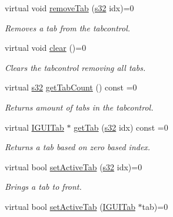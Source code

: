 \begin{DoxyCompactItemize}
virtual void \hyperlink{classirr_1_1gui_1_1IGUITabControl_a0d79c9d666527201b57e859e69b7523c}{remove\+Tab} (\hyperlink{namespaceirr_ac66849b7a6ed16e30ebede579f9b47c6}{s32} idx)=0
\begin{DoxyCompactList}\small\item\em Removes a tab from the tabcontrol. \end{DoxyCompactList}\item 
\mbox{\label{classirr_1_1gui_1_1IGUITabControl_ac5a41030a1fa56978da2142e00fef3f1}} 
virtual void \hyperlink{classirr_1_1gui_1_1IGUITabControl_ac5a41030a1fa56978da2142e00fef3f1}{clear} ()=0
\begin{DoxyCompactList}\small\item\em Clears the tabcontrol removing all tabs. \end{DoxyCompactList}\item 
\mbox{\label{classirr_1_1gui_1_1IGUITabControl_a9c0571f79bb538936182542562d2c520}} 
virtual \hyperlink{namespaceirr_ac66849b7a6ed16e30ebede579f9b47c6}{s32} \hyperlink{classirr_1_1gui_1_1IGUITabControl_a9c0571f79bb538936182542562d2c520}{get\+Tab\+Count} () const =0
\begin{DoxyCompactList}\small\item\em Returns amount of tabs in the tabcontrol. \end{DoxyCompactList}\item 
virtual \hyperlink{classirr_1_1gui_1_1IGUITab}{I\+G\+U\+I\+Tab} $\ast$ \hyperlink{classirr_1_1gui_1_1IGUITabControl_a1ce91106037c880aae15df77f42aeeda}{get\+Tab} (\hyperlink{namespaceirr_ac66849b7a6ed16e30ebede579f9b47c6}{s32} idx) const =0
\begin{DoxyCompactList}\small\item\em Returns a tab based on zero based index. \end{DoxyCompactList}\item 
virtual bool \hyperlink{classirr_1_1gui_1_1IGUITabControl_a2a2d810ff8a79c4226831b689a4d8b3a}{set\+Active\+Tab} (\hyperlink{namespaceirr_ac66849b7a6ed16e30ebede579f9b47c6}{s32} idx)=0
\begin{DoxyCompactList}\small\item\em Brings a tab to front. \end{DoxyCompactList}\item 
virtual bool \hyperlink{classirr_1_1gui_1_1IGUITabControl_acea5fca2d2a883a450d4df823eea27d5}{set\+Active\+Tab} (\hyperlink{classirr_1_1gui_1_1IGUITab}{I\+G\+U\+I\+Tab} $\ast$tab)=0

\end{DoxyCompactItemize}
